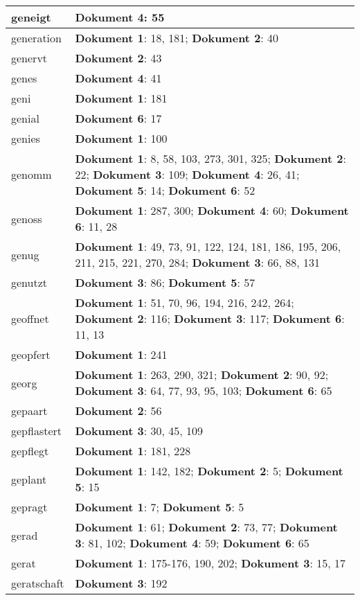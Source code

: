 \documentclass[a5paper]{article}
\begin{document}
\begin{longtable}[l]{|l|p{3in}|}
\hline
geneigt & \textbf{Dokument 4}: 55 \\
\hline
generation & \textbf{Dokument 1}: 18, 181; \textbf{Dokument 2}: 40 \\
\hline
genervt & \textbf{Dokument 2}: 43 \\
\hline
genes & \textbf{Dokument 4}: 41 \\
\hline
geni & \textbf{Dokument 1}: 181 \\
\hline
genial & \textbf{Dokument 6}: 17 \\
\hline
genies & \textbf{Dokument 1}: 100 \\
\hline
genomm & \textbf{Dokument 1}: 8, 58, 103, 273, 301, 325; \textbf{Dokument 2}: 22; \textbf{Dokument 3}: 109; \textbf{Dokument 4}: 26, 41; \textbf{Dokument 5}: 14; \textbf{Dokument 6}: 52 \\
\hline
genoss & \textbf{Dokument 1}: 287, 300; \textbf{Dokument 4}: 60; \textbf{Dokument 6}: 11, 28 \\
\hline
genug & \textbf{Dokument 1}: 49, 73, 91, 122, 124, 181, 186, 195, 206, 211, 215, 221, 270, 284; \textbf{Dokument 3}: 66, 88, 131 \\
\hline
genutzt & \textbf{Dokument 3}: 86; \textbf{Dokument 5}: 57 \\
\hline
geoffnet & \textbf{Dokument 1}: 51, 70, 96, 194, 216, 242, 264; \textbf{Dokument 2}: 116; \textbf{Dokument 3}: 117; \textbf{Dokument 6}: 11, 13 \\
\hline
geopfert & \textbf{Dokument 1}: 241 \\
\hline
georg & \textbf{Dokument 1}: 263, 290, 321; \textbf{Dokument 2}: 90, 92; \textbf{Dokument 3}: 64, 77, 93, 95, 103; \textbf{Dokument 6}: 65 \\
\hline
gepaart & \textbf{Dokument 2}: 56 \\
\hline
gepflastert & \textbf{Dokument 3}: 30, 45, 109 \\
\hline
gepflegt & \textbf{Dokument 1}: 181, 228 \\
\hline
geplant & \textbf{Dokument 1}: 142, 182; \textbf{Dokument 2}: 5; \textbf{Dokument 5}: 15 \\
\hline
gepragt & \textbf{Dokument 1}: 7; \textbf{Dokument 5}: 5 \\
\hline
gerad & \textbf{Dokument 1}: 61; \textbf{Dokument 2}: 73, 77; \textbf{Dokument 3}: 81, 102; \textbf{Dokument 4}: 59; \textbf{Dokument 6}: 65 \\
\hline
gerat & \textbf{Dokument 1}: 175-176, 190, 202; \textbf{Dokument 3}: 15, 17 \\
\hline
geratschaft & \textbf{Dokument 3}: 192 \\

\end{longtable}
\end{document}
